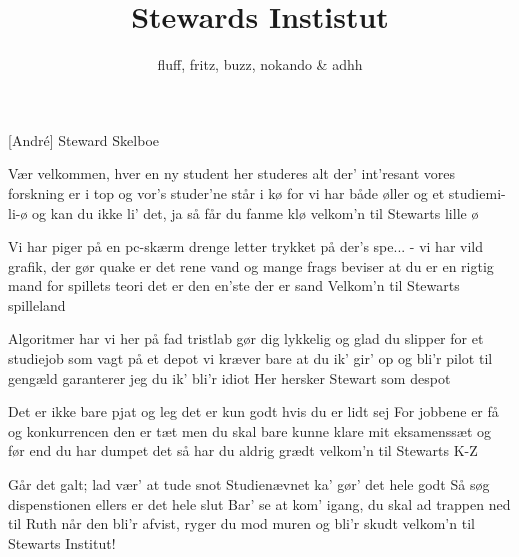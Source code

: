 \documentclass[a4paper,11pt]{article}
\title{Stewards Instistut}
\author{fluff, fritz, buzz, nokando \& adhh}
\begin{document}
  \maketitle
  
  \begin{roles}
    [Andr\'e] Steward Skelboe 
  \end{roles}


  
\begin{song}
    
 Vær velkommen, hver en ny student
her studeres alt der' int'resant
vores forskning er i top og vor's studer'ne står i kø
for vi har både øller og et studiemi-li-ø
og kan du ikke li' det, ja så får du fanme klø
velkom'n til Stewarts lille ø

Vi har piger på en pc-skærm
drenge letter trykket på der's spe... 
- vi har vild grafik, der gør quake er det rene vand
og mange frags beviser at du er en rigtig mand
for spillets teori det er den en'ste der er sand
Velkom'n til Stewarts spilleland

Algoritmer har vi her på fad
tristlab gør dig lykkelig og glad
du slipper for et studiejob som vagt på et depot
vi kræver bare at du ik' gir' op og bli'r pilot
til gengæld garanterer jeg du ik' bli'r idiot
Her hersker Stewart som despot


Det er ikke bare pjat og leg
det er kun godt hvis du er lidt sej
For jobbene er få og konkurrencen den er tæt
men du skal bare kunne klare mit eksamenssæt
og før end du har dumpet det så har du aldrig grædt
velkom'n til Stewarts K-Z

Går det galt; lad vær' at tude snot
Studienævnet ka' gør' det hele godt
Så søg dispenstionen ellers er det hele slut
Bar' se at kom' igang, du skal ad trappen ned til Ruth
når den bli'r afvist, ryger du mod muren og bli'r skudt
velkom'n til Stewarts Institut!
    
\end{song}
\end{document}
